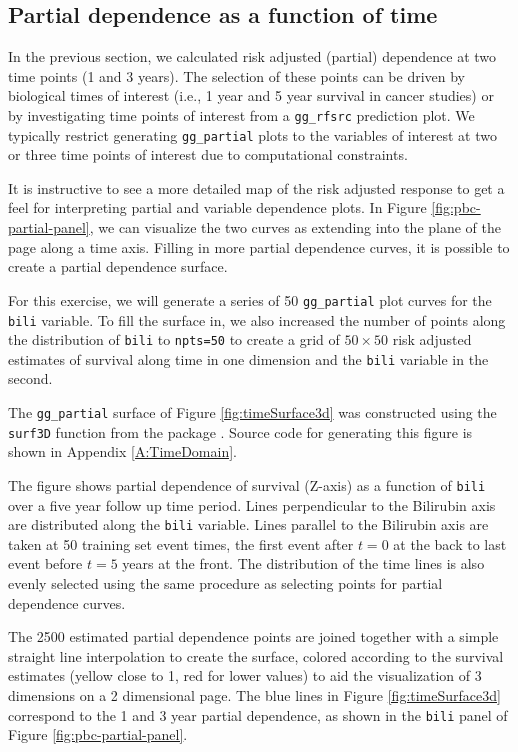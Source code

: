 \documentclass[article, nojss]{jss}
\begin{document}
\subsection{Partial dependence as a function of
time}\label{partial-dependence-as-a-function-of-time}

In the previous section, we calculated risk adjusted (partial)
dependence at two time points (1 and 3 years). The selection of these
points can be driven by biological times of interest (i.e., 1 year and 5
year survival in cancer studies) or by investigating time points of
interest from a \texttt{gg\_rfsrc} prediction plot. We typically
restrict generating \texttt{gg\_partial} plots to the variables of
interest at two or three time points of interest due to computational
constraints.

It is instructive to see a more detailed map of the risk adjusted
response to get a feel for interpreting partial and variable dependence
plots. In Figure \ref{fig:pbc-partial-panel}, we can visualize the two
curves as extending into the plane of the page along a time axis.
Filling in more partial dependence curves, it is possible to create a
partial dependence surface.

For this exercise, we will generate a series of 50 \texttt{gg\_partial}
plot curves for the \texttt{bili} variable. To fill the surface in, we
also increased the number of points along the distribution of
\texttt{bili} to \texttt{npts=50} to create a grid of \(50 \times 50\)
risk adjusted estimates of survival along time in one dimension and the
\texttt{bili} variable in the second.

The \texttt{gg\_partial} surface of Figure \ref{fig:timeSurface3d} was
constructed using the \texttt{surf3D} function from the 
package
\citep[\url{http://CRAN.R-project.org/package=plot3D}]{plot3D:2014}.
Source code for generating this figure is shown in Appendix
\ref{A:TimeDomain}.

The figure shows partial dependence of survival (Z-axis) as a function
of \texttt{bili} over a five year follow up time period. Lines
perpendicular to the Bilirubin axis are distributed along the
\texttt{bili} variable. Lines parallel to the Bilirubin axis are taken
at 50 training set event times, the first event after \(t=0\) at the
back to last event before \(t=5\) years at the front. The distribution
of the time lines is also evenly selected using the same procedure as
selecting points for partial dependence curves.

The 2500 estimated partial dependence points are joined together with a
simple straight line interpolation to create the surface, colored
according to the survival estimates (yellow close to 1, red for lower
values) to aid the visualization of 3 dimensions on a 2 dimensional
page. The blue lines in Figure \ref{fig:timeSurface3d} correspond to the
1 and 3 year partial dependence, as shown in the \texttt{bili} panel of
Figure \ref{fig:pbc-partial-panel}.
\end{document}
